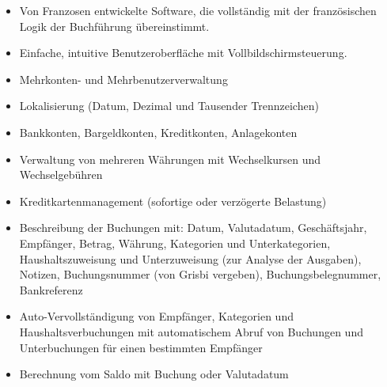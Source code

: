\begin{itemize}
	\item Von Franzosen entwickelte Software, die vollständig mit der französischen Logik der Buchführung übereinstimmt.%
	\item Einfache, intuitive Benutzeroberfläche mit Vollbildschirmsteuerung.%
	\item Mehrkonten- und Mehrbenutzerverwaltung%
	\item Lokalisierung (Datum, Dezimal und Tausender Trennzeichen)%
	\item Bankkonten, Bargeldkonten, Kreditkonten, Anlagekonten%
	\item Verwaltung von mehreren Währungen mit Wechselkursen und Wechselgebühren%
	\item Kreditkartenmanagement (sofortige oder verzögerte Belastung)%
	\item Beschreibung der Buchungen mit: Datum, Valutadatum, Geschäftsjahr, Empfänger, Betrag, Währung, Kategorien und Unterkategorien, Haushaltszuweisung und Unterzuweisung (zur Analyse der Ausgaben), Notizen, Buchungsnummer (von Grisbi vergeben), Buchungsbelegnummer, Bankreferenz%
	\item Auto-Vervollständigung von Empfänger, Kategorien und Haushaltsverbuchungen mit automatischem Abruf von Buchungen und Unterbuchungen für einen bestimmten Empfänger%
	\item Berechnung vom Saldo mit Buchung oder Valutadatum%

\end{itemize}
